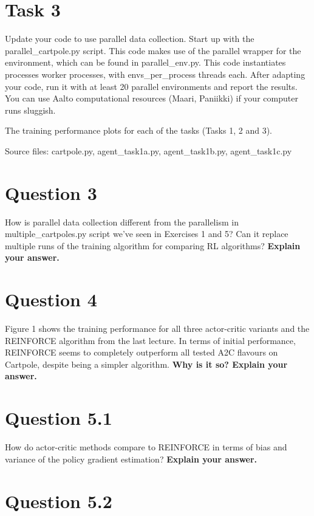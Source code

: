 \documentclass[12pt]{article}
\begin{document}
\section*{Task 3}

Update your code to use parallel data collection. Start up with the
parallel\_cartpole.py script. This code makes use of the parallel wrapper for the environment,
which can be found in parallel\_env.py. This code instantiates processes worker processes,
with envs\_per\_process threads each. After adapting your code, run it with at least 20 parallel
environments and report the results. You can use Aalto computational resources (Maari,
Paniikki) if your computer runs sluggish.
\newline

The training performance plots for each of the tasks (Tasks 1, 2 and 3).
\newline

\noindent
Source files: cartpole.py, agent\_task1a.py, agent\_task1b.py, agent\_task1c.py 

\section*{Question 3}

How is parallel data collection different from the parallelism in
multiple\_cartpoles.py script we’ve seen in Exercises 1 and 5? Can it replace multiple runs of
the training algorithm for comparing RL algorithms? \textbf{Explain your answer.}

\section*{Question 4}

Figure 1 shows the training performance for all three actor-critic
variants and the REINFORCE algorithm from the last lecture. In terms of initial performance,
REINFORCE seems to completely outperform all tested A2C flavours on Cartpole, despite being
a simpler algorithm. \textbf{Why is it so? Explain your answer.}

\section*{Question 5.1}

How do actor-critic methods compare to REINFORCE in terms of
bias and variance of the policy gradient estimation? \textbf{Explain your answer.}

\section*{Question 5.2}
\end{document}
